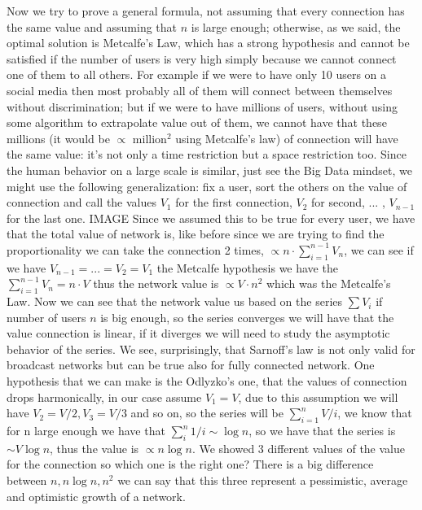 \documentclass[12pt, a4page]{article}
\begin{document}
Now we try to prove a general formula, not %
assuming that every connection has the same value and assuming that $n$ is large enough; otherwise, as we said, %
the optimal solution is Metcalfe's Law, which has a strong hypothesis and cannot be satisfied if the number of users is very high simply because we cannot connect one of them to all others.
For example if we %
were to have only 10 users on a social media then most probably all of them will connect between themselves without discrimination; but if we were to have millions of users, without using some algorithm to extrapolate value out of them, we cannot have that these millions (it would be $\propto$ million$^2$ using Metcalfe's law) of connection will have the same value: it's not only a time restriction but a space restriction too. Since the human behavior on a large scale is similar, just see the Big Data mindset, we might use the following generalization:
fix a user, sort the others on the value of connection and call the values $V_1$ for the first connection, $V_2$ for second, ... , $V_{n-1}$ for the last one.
\newline IMAGE \newline
Since we assumed this to be true for every user, we have that the total value of network is, like before since we are trying to find the proportionality we can take the connection 2 times, $\propto n \cdot \sum_{i=1}^{n-1} V_n$, we can see if we have $V_{n-1}=...=V_2=V_1$ the Metcalfe hypothesis we have the $ \sum_{i=1}^{n-1} V_n = n\cdot V$ thus the network value is $\propto V \cdot n^2$ which was the Metcalfe's Law.
Now we can see that the network value us based on the series $\sum V_i$ if number of users $n$ is big enough, so the series converges we will have that the value connection is linear, if it diverges we will need to study the asymptotic behavior of the series.
We see, surprisingly, that Sarnoff's law is not only valid for broadcast networks but can be true also for fully connected network.\newline
One hypothesis that we can make is the Odlyzko's one, that the values of connection drops harmonically, in our case assume $V_1 = V$, due to this assumption we will have $V_2 = V/2, V_3 = V/3$ and so on, so the series will be $\sum_{i=1}^n V/i$, we know that for n large enough we have that $\sum_i^n 1/i \sim \log n$, so we have that the series is $\sim V \log n$, thus the value is $\propto n \log n$.\newline
We showed 3 different values of the value for the connection so which one is the right one? There is a big difference between $n, n\log n, n^2$ we can say that this three represent a pessimistic, average and optimistic growth of a network.
\end{document}
